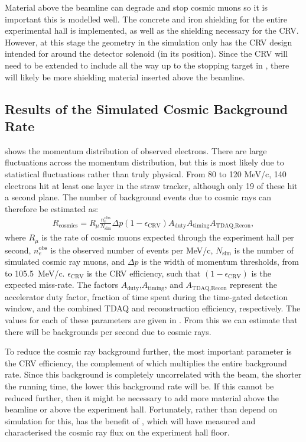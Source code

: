 Material above the beamline can degrade and stop cosmic muons so it is important this is modelled well.
The concrete and iron shielding for the entire experimental hall is implemented, as well as the shielding necessary for the \ac{CRV}.
However, at this stage the geometry in the simulation only has the CRV design intended for \phaseI around the detector solenoid (in its \phaseII position).
Since the CRV will need to be extended to include all the way up to the stopping target in \phaseII, there will likely be more shielding material inserted above the beamline.

\subsection{Results of the Simulated Cosmic Background Rate}
\FigBgCosmicBeam
\FigBgCosmicMomenta
{} shows the momentum distribution of observed electrons.  
There are large fluctuations across the momentum distribution, but this is most likely due to statistical fluctuations rather than truly physical.
From 80 to 120 MeV/c, 140 electrons hit at least one layer in the straw tracker, although only 19 of these hit a second plane.
The number of background events due to cosmic rays can therefore be estimated as:
\begin{align}
	R_\textrm{cosmics}=R_\mu\frac{n_e^\textrm{obs}}{N_\textrm{sim}} \Delta{}p (1-\epsilon_\textrm{CRV}) A_\textrm{duty}A_\textrm{timing}A_\textrm{TDAQ,Recon},
\end{align}
where $R_\mu$ is the rate of cosmic muons expected through the experiment hall per second, $n_e^\textrm{obs}$ is the observed number of events per MeV/c, $N_\textrm{sim}$ is the number of simulated cosmic ray muons, and $\Delta{}p$ is the width of momentum thresholds, from \VarMomThreshold to 105.5~MeV/c.
$\epsilon_\textrm{CRV}$ is the \ac{CRV} efficiency, such that $(1-\epsilon_\textrm{CRV})$ is the expected miss-rate. 
The factors $A_\textrm{duty}$,$A_\textrm{timing}$, and $A_\textrm{TDAQ,Recon}$ represent the accelerator duty factor, fraction of time spent during the time-gated detection window, and the combined TDAQ and reconstruction efficiency, respectively.  
The values for each of these parameters are given in .
From this we can estimate that there will be \VarCosmicRatePerSecond backgrounds per second due to cosmic rays.
\TabBgCosmicParameters

To reduce the cosmic ray background further, the most important parameter is the \ac{CRV} efficiency, the complement of which multiplies the entire background rate.
Since this background is completely uncorrelated with the beam, the shorter the running time, the lower this background rate will be.
If this cannot be reduced further, then it might be necessary to add more material above the beamline or above the experiment hall.
Fortunately, rather than depend on simulation for this, \phaseII has the benefit of \phaseI, which will have measured and characterised the cosmic ray flux on the experiment hall floor.

